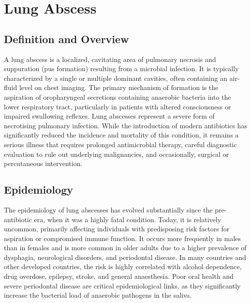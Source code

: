 \chapter{Lung Abscess}

\section*{Definition and Overview}
A lung abscess is a localized, cavitating area of pulmonary necrosis and suppuration (pus formation) resulting from a microbial infection. It is typically characterized by a single or multiple dominant cavities, often containing an air-fluid level on chest imaging. The primary mechanism of formation is the aspiration of oropharyngeal secretions containing anaerobic bacteria into the lower respiratory tract, particularly in patients with altered consciousness or impaired swallowing reflexes. Lung abscesses represent a severe form of necrotising pulmonary infection. While the introduction of modern antibiotics has significantly reduced the incidence and mortality of this condition, it remains a serious illness that requires prolonged antimicrobial therapy, careful diagnostic evaluation to rule out underlying malignancies, and occasionally, surgical or percutaneous intervention.

\section*{Epidemiology}
The epidemiology of lung abscesses has evolved substantially since the pre-antibiotic era, when it was a highly fatal condition. Today, it is relatively uncommon, primarily affecting individuals with predisposing risk factors for aspiration or compromised immune function. It occurs more frequently in males than in females and is more common in older adults due to a higher prevalence of dysphagia, neurological disorders, and periodontal disease. In many countries and other developed countries, the risk is highly correlated with alcohol dependence, drug overdose, epilepsy, stroke, and general anaesthesia. Poor oral health and severe periodontal disease are critical epidemiological links, as they significantly increase the bacterial load of anaerobic pathogens in the saliva.


